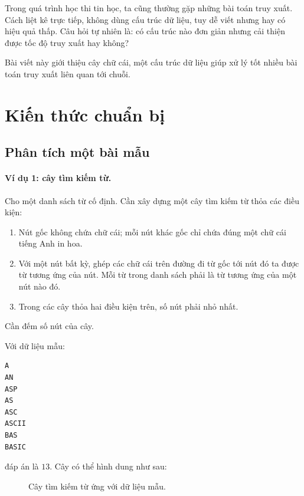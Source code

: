 \documentclass[11pt]{article}
\begin{document}
Trong quá trình học thi tin học, ta cũng thường gặp những bài toán truy xuất.
Cách liệt kê trực tiếp, không dùng cấu trúc dữ liệu, tuy dễ viết nhưng hay có
hiệu quả thấp. Câu hỏi tự nhiên là: có cấu trúc nào đơn giản nhưng cải thiện
được tốc độ truy xuất hay không?

Bài viết này giới thiệu cây chữ cái, một cấu trúc dữ liệu giúp xử lý tốt nhiều
bài toán truy xuất liên quan tới chuỗi.

\section{Kiến thức chuẩn bị}

\subsection{Phân tích một bài mẫu}

\paragraph{Ví dụ 1: cây tìm kiếm từ.}
Cho một danh sách từ cố định. Cần xây dựng một cây tìm kiếm từ thỏa các điều
kiện:
\begin{enumerate}
  \item Nút gốc không chứa chữ cái; mỗi nút khác gốc chỉ chứa đúng một chữ cái
  tiếng Anh in hoa.
  \item Với một nút bất kỳ, ghép các chữ cái trên đường đi từ gốc tới nút đó
  ta được từ tương ứng của nút. Mỗi từ trong danh sách phải là từ tương ứng
  của một nút nào đó.
  \item Trong các cây thỏa hai điều kiện trên, số nút phải nhỏ nhất.
\end{enumerate}
Cần đếm số nút của cây.

Với dữ liệu mẫu:
\begin{verbatim}
A
AN
ASP
AS
ASC
ASCII
BAS
BASIC
\end{verbatim}
đáp án là \(13\). Cây có thể hình dung như sau:
\begin{figure}[htbp]
\centering
{}
\caption{Cây tìm kiếm từ ứng với dữ liệu mẫu.}
\end{figure}
\end{document}
